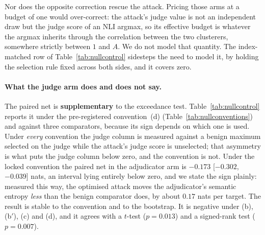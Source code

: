 Nor does the opposite correction rescue the attack. Pricing those arms at a budget of one
would over-correct: the attack's judge value is not an independent draw but the judge score of
an NLI argmax, so its effective budget is whatever the argmax inherits through the correlation
between the two clusterers, somewhere strictly between $1$ and $A$. We do not model that
quantity. The index-matched row of Table~\ref{tab:nullcontrol} sidesteps the need to model it,
by holding the selection rule fixed across both sides, and it covers zero.

\paragraph{What the judge arm does and does not say.}
The paired net is \textbf{supplementary} to the exceedance test. Table~\ref{tab:nullcontrol}
reports it under the pre-registered convention~(d) (Table~\ref{tab:nullconventions}) and
against three comparators, because its sign depends on which one is used. Under \emph{every}
convention the judge column is measured against a benign maximum selected on the judge while
the attack's judge score is unselected; that asymmetry is what puts the judge column below
zero, and the convention is not.
Under the locked convention the paired net in the adjudicator arm is
$-0.173$ [$-0.302$, $-0.039$] nats, an interval lying entirely below zero, and we state the
sign plainly: measured this way, the optimised attack moves the adjudicator's semantic entropy
\emph{less} than the benign comparator does, by about $0.17$ nats per target. The result is
stable to the convention and to the bootstrap. It is negative under (b), (b$'$), (c) and (d),
and it agrees with a $t$-test ($p{=}0.013$) and a signed-rank test ($p{=}0.007$).

